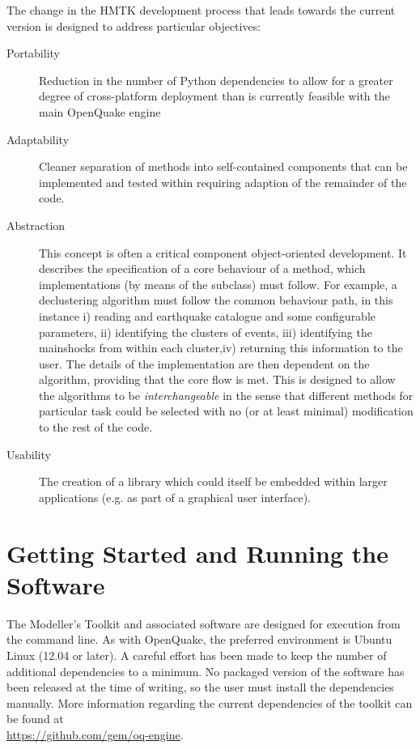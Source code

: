The change in the HMTK development process that leads towards the current version is designed to address particular objectives:

\begin{description}
\item[Portability] Reduction in the number of Python dependencies to allow for a greater degree of cross-platform deployment than is currently feasible with the main OpenQuake engine

\item[Adaptability] Cleaner separation of methods into self-contained components that can be implemented and tested within requiring adaption of the remainder of the code.

\item[Abstraction] This concept is often a critical component object-oriented development. It describes the specification of a core behaviour of a method, which implementations (by means of the subclass) must follow. For example, a declustering algorithm must follow the common behaviour path, in this instance i) reading and earthquake catalogue and some configurable parameters, ii) identifying the clusters of events, iii) identifying the mainshocks from within each cluster,iv) returning this information to the user. The details of the implementation are then dependent on the algorithm, providing that the core flow is met. This is designed to allow the algorithms to be \emph{interchangeable} in the sense that different methods for  particular task could be selected with no (or at least minimal) modification to the rest of the code.

\item[Usability] The creation of a library which could itself be embedded within larger applications (e.g. as part of a graphical user interface).
 
\end{description}



\section{Getting Started and Running the Software}

The Modeller's Toolkit and associated software are designed for execution 
from the command line. As with OpenQuake, the preferred environment is 
Ubuntu Linux (12.04 or later). A careful effort has been made to keep 
the number of additional dependencies to a minimum. No packaged version of the software has been released at the time of writing, so the user must install the dependencies manually. More information regarding the current dependencies of the toolkit can be found at \hfill \\
\href{https://github.com/gem/oq-engine}{https://github.com/gem/oq-engine}. 

